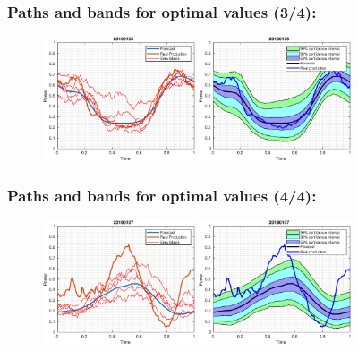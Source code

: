 \documentclass[aspectratio=169]{beamer}\usepackage[utf8]{inputenc}
\begin{document}

\begin{frame}\frametitle{Paths and bands for optimal values (3/4):}

\begin{figure}[ht!]
\centering
\includegraphics[width=0.4\textwidth]{../Results/paths_testing_days/optimal_value/3.eps}\quad
\includegraphics[width=0.4\textwidth]{../Results/bands_testing_days/optimal_value/3.eps}
\end{figure}

\end{frame}


\begin{frame}\frametitle{Paths and bands for optimal values (4/4):}

\begin{figure}[ht!]
\centering
\includegraphics[width=0.4\textwidth]{../Results/paths_testing_days/optimal_value/4.eps}\quad
\includegraphics[width=0.4\textwidth]{../Results/bands_testing_days/optimal_value/4.eps}
\end{figure}
\end{frame}
\end{document}
